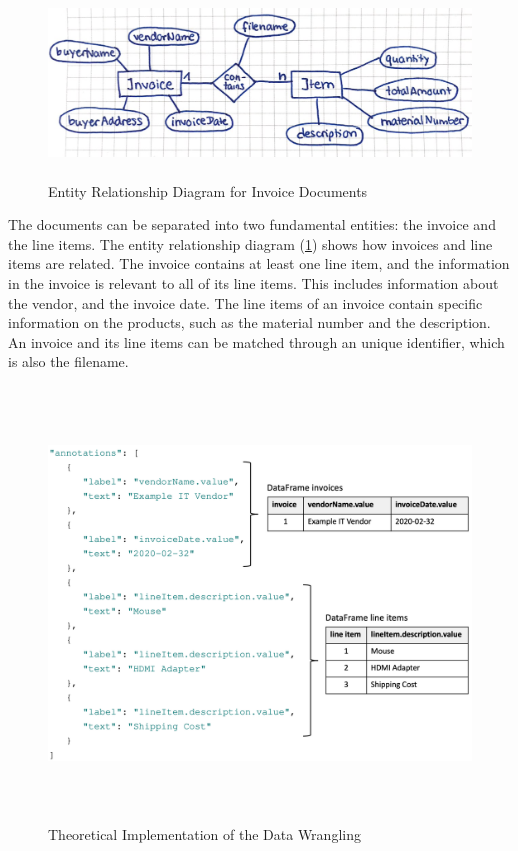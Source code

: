     \begin{figure}[ht]
        \centering
        \includegraphics[height=5cm]{Bilder/practical/entity_relationship.png}
        \caption{Entity Relationship Diagram for Invoice Documents}
        \label{fig:er}
    \end{figure}
	The documents can be separated into two fundamental entities: the invoice and the line items. The entity relationship diagram (\ref{fig:er}) shows how invoices and line items are related. The invoice contains at least one line item, and the information in the invoice is relevant to all of its line items. This includes information about the vendor, and the invoice date. The line items of an invoice contain specific information on the products, such as the material number and the description.
	An invoice and its line items can be matched through an unique identifier, which is also the filename.

	 \begin{figure}[ht]
		\centering
		\includegraphics[height=11.5cm]{Bilder/preprocessing/df_schema.png}
		\caption{Theoretical Implementation of the Data Wrangling}
		\label{fig:invoice_df_schema}
	\end{figure}	

